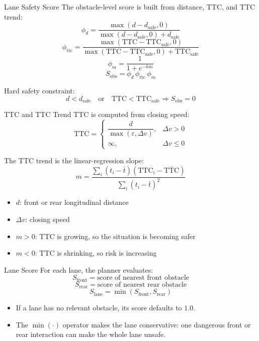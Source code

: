 \documentclass{beamer}
\begin{document}
\begin{frame}{Lane Safety Score}
  The obstacle-level score is built from distance, TTC, and TTC trend:
  \[
    \phi_d = \frac{\max(d - d_{\text{safe}}, 0)}{\max(d - d_{\text{safe}}, 0) + d_{\text{safe}}}
  \]
  \[
    \phi_{\text{ttc}} = \frac{\max(\text{TTC} - \text{TTC}_{\text{safe}}, 0)}{\max(\text{TTC} - \text{TTC}_{\text{safe}}, 0) + \text{TTC}_{\text{safe}}}
  \]
  \[
    \phi_m = \frac{1}{1 + e^{-k m}}
  \]
  \[
    S_{\text{obs}} = \phi_d \, \phi_{\text{ttc}} \, \phi_m
  \]

  Hard safety constraint:
  \[
    d < d_{\text{safe}} \quad \text{or} \quad \text{TTC} < \text{TTC}_{\text{safe}}
    \Longrightarrow
    S_{\text{obs}} = 0
  \]
\end{frame}

\begin{frame}{TTC and TTC Trend}
  TTC is computed from closing speed:
  \[
    \text{TTC} =
    \begin{cases}
      \dfrac{d}{\max(\varepsilon, \Delta v)}, & \Delta v > 0 \\
      \infty, & \Delta v \le 0
    \end{cases}
  \]

  \vspace{0.5em}
  The TTC trend is the linear-regression slope:
  \[
    m = \frac{\sum_i (t_i - \bar{t})(\text{TTC}_i - \overline{\text{TTC}})}
             {\sum_i (t_i - \bar{t})^2}
  \]

  \begin{itemize}
    \item \(d\): front or rear longitudinal distance
    \item \(\Delta v\): closing speed
    \item \(m > 0\): TTC is growing, so the situation is becoming safer
    \item \(m < 0\): TTC is shrinking, so risk is increasing
  \end{itemize}
\end{frame}

\begin{frame}{Lane Score}
  For each lane, the planner evaluates:
  \[
    S_{\text{front}} = \text{score of nearest front obstacle}
  \]
  \[
    S_{\text{rear}} = \text{score of nearest rear obstacle}
  \]
  \[
    S_{\text{lane}} = \min(S_{\text{front}}, S_{\text{rear}})
  \]

  \begin{itemize}
    \item If a lane has no relevant obstacle, its score defaults to \(1.0\).
    \item The \(\min(\cdot)\) operator makes the lane conservative:
    one dangerous front or rear interaction can make the whole lane unsafe.
  \end{itemize}
\end{frame}
\end{document}
